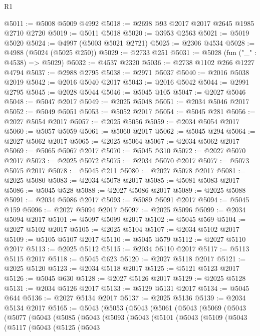 \begin{lexlean}{R1}
\begin{coremodule}
@5011 := @5008 @5009 @4992
@5018 := @2698 @93 @2017 @2017 @2645 @1985 @2710 @2720
@5019 := @5011 @5018
@5020 := @3953 @2563
@5021 := @5019 @5020
@5024 := @4997 (@5003 @5021 @2721)
@5025 := @2306 @4534
@5028 := @4988 (@5024 (@5025 @250))
@5029 := @2733 @251
@5031 := @5028 (fun ("_" : @4538) => @5029)
@5032 := @4537 @2320
@5036 := @2738 @1102 @266 @1227 @4794
@5037 := @2988 @2795
@5038 := @2971 @5037
@5040 := @2016 @5038 @2019
@5042 := @2016 @5040 @2017
@5043 := @2016 @5042
@5044 := @2991 @2795
@5045 := @2028 @5044
@5046 := @5045 @105
@5047 := @2027 @5046
@5048 := @5047 @2017
@5049 := @2025 @5048
@5051 := @2034 @5046 @2017
@5052 := @5049 @5051
@5053 := @5052 @2017
@5054 := @5045 @281
@5056 := @2027 @5054 @2017
@5057 := @2025 @5056
@5059 := @2034 @5054 @2017
@5060 := @5057 @5059
@5061 := @5060 @2017
@5062 := @5045 @294
@5064 := @2027 @5062 @2017
@5065 := @2025 @5064
@5067 := @2034 @5062 @2017
@5069 := @5065 @5067 @2017
@5070 := @5045 @310
@5072 := @2027 @5070 @2017
@5073 := @2025 @5072
@5075 := @2034 @5070 @2017
@5077 := @5073 @5075 @2017
@5078 := @5045 @211
@5080 := @2027 @5078 @2017
@5081 := @2025 @5080
@5083 := @2034 @5078 @2017
@5085 := @5081 @5083 @2017
@5086 := @5045 @528
@5088 := @2027 @5086 @2017
@5089 := @2025 @5088
@5091 := @2034 @5086 @2017
@5093 := @5089 @5091 @2017
@5094 := @5045 @159
@5096 := @2027 @5094 @2017
@5097 := @2025 @5096
@5099 := @2034 @5094 @2017
@5101 := @5097 @5099 @2017
@5102 := @5045 @569
@5104 := @2027 @5102 @2017
@5105 := @2025 @5104
@5107 := @2034 @5102 @2017
@5109 := @5105 @5107 @2017
@5110 := @5045 @579
@5112 := @2027 @5110 @2017
@5113 := @2025 @5112
@5115 := @2034 @5110 @2017
@5117 := @5113 @5115 @2017
@5118 := @5045 @623
@5120 := @2027 @5118 @2017
@5121 := @2025 @5120
@5123 := @2034 @5118 @2017
@5125 := @5121 @5123 @2017
@5126 := @5045 @630
@5128 := @2027 @5126 @2017
@5129 := @2025 @5128
@5131 := @2034 @5126 @2017
@5133 := @5129 @5131 @2017
@5134 := @5045 @644
@5136 := @2027 @5134 @2017
@5137 := @2025 @5136
@5139 := @2034 @5134 @2017
@5165 := @5043
    (@5053
      (@5043
        (@5061
          (@5043
            (@5069
              (@5043
                (@5077
                  (@5043
                    (@5085
                      (@5043
                        (@5093
                          (@5043
                            (@5101
                              (@5043
                                (@5109
                                  (@5043
                                    (@5117
                                      (@5043
                                        (@5125
                                          (@5043

\end{coremodule}
\end{lexlean}
